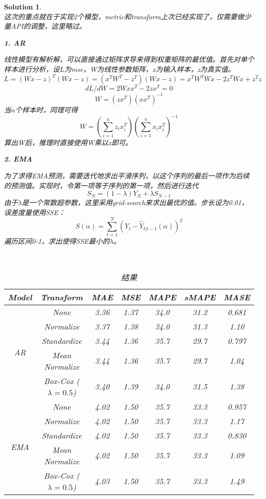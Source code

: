 \documentclass[a4paper,UTF8]{article}
\numberwithin{equation}{section}
\newtheorem*{mySol}{Solution}
\begin{document}
\begin{mySol}
~\\
这次的重点就在于实现2个模型，metric和transform上次已经实现了，仅需要做少量API的调整，这里略过。

\textbf{1. AR}

线性模型有解析解，可以直接通过矩阵求导来得到权重矩阵的最优值。首先对单个样本进行分析，设$L$为mse，W为线性参数矩阵，x为输入样本，z为真实值。
$$
L = (Wx-z)^T (Wx-z) = (x^T W^T - z^T) (Wx-z) = x^T W^T Wx - 2z^T Wx + z^T z
$$
$$
dL/dW = 2 Wx x^T - 2z x^T = 0
$$
$$
W = (z x^T)(x x^T)^{-1}
$$
当$n$个样本时，同理可得
$$
W = (\sum_{i=1}^{n} z_i x_i^T)(\sum_{i=1}^{n} x_i x_i^T)^{-1}
$$
算出W后，推理时直接使用W乘以x即可。

\textbf{2. EMA}

为了求得EMA预测，需要迭代地求出平滑序列，以这个序列的最后一项作为后续的预测值。实现时，令第一项等于序列的第一项，然后进行迭代
$$
S_N=(1-\lambda)Y_N+\lambda S_{N-1}
$$
由于$\lambda$是一个常数超参数，这里采用grid-search来求出最优的值。步长设为0.01，误差度量使用SSE：
$$
S(\alpha)=\sum_{t=1}^{N}(Y_t-\hat{Y}_{t|t-1}(\alpha))^2
$$
遍历区间0-1，求出使得SSE最小的$\lambda$。

~\\
\begin{table}[]
	\centering
	\caption{结果}
	\begin{tabular}{ccccccc}
		\toprule
		Model                      & Transform & MAE & MSE & MAPE &sMAPE&	MASE \\
		\midrule
        \multirow{5}{*}{AR}
        & None      & 3.36 & 1.37 & 34.0 & 31.2 & 0.681 \\
        & Normalize  & 3.37 & 1.38 & 34.0 & 31.3 & 1.10 \\
        & Standardize & 3.44 & 1.36 & 35.7 & 29.7 & 0.797  \\
        & Mean Normalize & 3.44 & 1.36 & 35.7 & 29.7 & 1.04 \\
        & Box-Cox ($\lambda=0.5$)  & 3.40 & 1.39 & 34.0 & 31.5 & 1.38 \\
        \midrule
        \multirow{5}{*}{EMA}
        & None      & 4.02 & 1.50 & 35.7 & 33.3 & 0.957 \\
        & Normalize  & 4.02 & 1.50 & 35.7 & 33.3 & 1.17 \\
        & Standardize & 4.02 & 1.50 & 35.7 & 33.3 & 0.830 \\
        & Mean Normalize & 4.02 & 1.50 & 35.7 & 33.3 & 1.09 \\
        & Box-Cox ($\lambda=0.5$) & 4.03 & 1.50 & 35.7 & 33.3 & 1.49 \\
		\bottomrule
	\end{tabular}
\label{tb:example}
\end{table}
~\\
~\\
~\\
\end{mySol}
\end{document}
